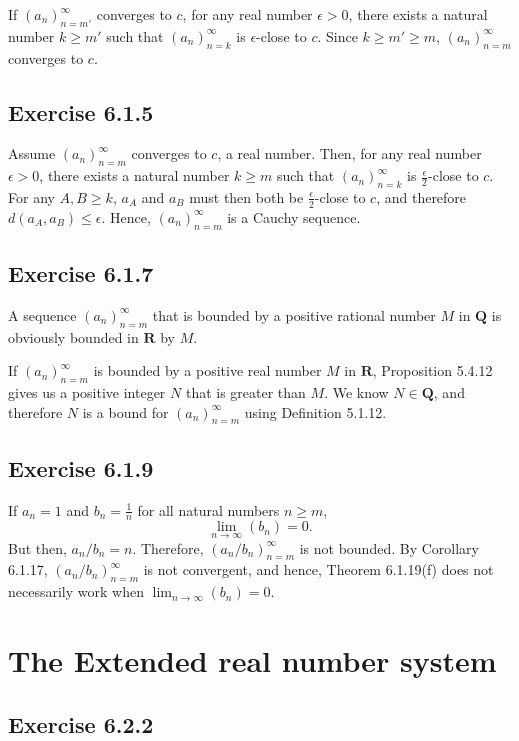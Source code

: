 \documentclass[12pt, oneside]{book}
\begin{document}
	If $(a_n)_{n = m'}^\infty$ converges to $c$, for any real number $\epsilon > 0$, there exists a natural number $k \ge m'$ such that $(a_n)_{n = k}^\infty$ is $\epsilon$-close to $c$. Since $k \ge m' \ge m$, $(a_n)_{n = m}^\infty$ converges to $c$.
	
	\subsection*{Exercise 6.1.5}
	
	Assume $(a_n)_{n = m}^\infty$ converges to $c$, a real number. Then, for any real number $\epsilon > 0$, there exists a natural number $k \ge m$ such that $(a_n)_{n = k}^\infty$ is $\frac{\epsilon}{2}$-close to $c$. For any $A, B \ge k$, $a_A$ and $a_B$ must then both be $\frac{\epsilon}{2}$-close to $c$, and therefore $d(a_A, a_B) \le \epsilon$. Hence, $(a_n)_{n = m}^\infty$ is a Cauchy sequence.
	
	\subsection*{Exercise 6.1.7}
	
	A sequence $(a_n)_{n = m}^\infty$ that is bounded by a positive rational number $M$ in $\mathbf{Q}$ is obviously bounded in $\mathbf{R}$ by $M$.
	
	If $(a_n)_{n = m}^\infty$ is bounded by a positive real number $M$ in $\mathbf{R}$, Proposition 5.4.12 gives us a positive integer $N$ that is greater than $M$. We know $N \in \mathbf{Q}$, and therefore $N$ is a bound for $(a_n)_{n = m}^\infty$ using Definition 5.1.12.
	
	\subsection*{Exercise 6.1.9}
	
	If $a_n = 1$ and $b_n = \frac{1}{n}$ for all natural numbers $n \ge m$,
	\[\lim_{n \to \infty} (b_n) = 0.\]
	But then, $a_n / b_n = n$. Therefore, $(a_n / b_n)_{n = m}^\infty$ is not bounded. By Corollary 6.1.17, $(a_n / b_n)_{n = m}^\infty$ is not convergent, and hence, Theorem 6.1.19(f) does not necessarily work when $\lim_{n \to \infty} (b_n) = 0$.
	
	\section{The Extended real number system}
	
	\subsection*{Exercise 6.2.2}
	
\end{document}
